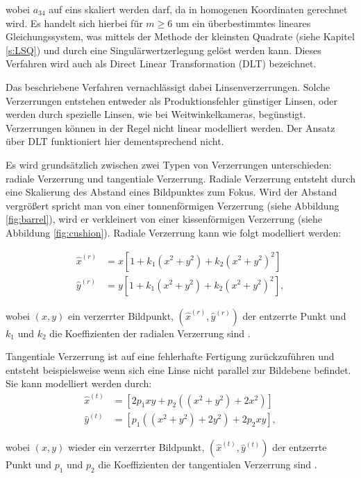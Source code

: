 wobei $a_{34}$ auf eins skaliert werden darf, da in homogenen Koordinaten gerechnet wird. Es handelt sich hierbei für $m \geq 6$ um ein überbestimmtes lineares Gleichungssystem, was mittels der Methode der kleinsten Quadrate (siehe Kapitel \ref{s:LSQ}) und durch eine Singulärwertzerlegung gelöst werden kann.
Dieses Verfahren wird auch als Direct Linear Transformation (DLT) bezeichnet.

Das beschriebene Verfahren vernachlässigt dabei Linsenverzerrungen. Solche Verzerrungen entstehen entweder als Produktionsfehler günstiger Linsen, oder werden durch spezielle Linsen, wie bei Weitwinkelkameras, begünstigt. Verzerrungen können in der Regel nicht linear modelliert werden. Der Ansatz über DLT funktioniert hier dementsprechend nicht.

Es wird grundsätzlich zwischen zwei Typen von Verzerrungen unterschieden: radiale Verzerrung und tangentiale Verzerrung.
Radiale Verzerrung entsteht durch eine Skalierung des Abstand eines Bildpunktes zum Fokus. Wird der Abstand vergrößert spricht man von einer tonnenförmigen Verzerrung (siehe Abbildung \ref{fig:barrel}), wird er verkleinert von einer kissenförmigen Verzerrung (siehe Abbildung \ref{fig:cushion}).
Radiale Verzerrung kann wie folgt modelliert werden:

\[
\begin{aligned}
\hat{x}^{(r)} &= x\left[1 + k_1\left(x^2 + y^2\right) + k_2\left(x^2 + y^2\right)^2 \right] \\
\hat{y}^{(r)} &= y\left[1 + k_1\left(x^2 + y^2\right) + k_2\left(x^2 + y^2\right)^2 \right],
\end{aligned}
\]

wobei $(x,y)$ ein verzerrter Bildpunkt, $(\hat{x}^{(r)}, \hat{y}^{(r)})$ der entzerrte Punkt und $k_1$ und $k_2$ die Koeffizienten der radialen Verzerrung sind \cite{Zhang2002}.

Tangentiale Verzerrung ist auf eine fehlerhafte Fertigung zurückzuführen und entsteht beispielsweise wenn sich eine Linse nicht parallel zur Bildebene befindet.
Sie kann modelliert werden durch:
\[
\begin{aligned}
\hat{x}^{(t)} &= \left[2p_1xy + p_2\left((x^2 + y^2) + 2x^2\right)\right] \\
\hat{y}^{(t)} &= \left[p_1\left((x^2 + y^2) + 2y^2\right) + 2p_2xy\right],
\end{aligned}
\]

wobei $(x,y)$ wieder ein verzerrter Bildpunkt, $(\hat{x}^{(t)}, \hat{y}^{(t)})$ der entzerrte Punkt und $p_1$ und $p_2$ die Koeffizienten der tangentialen Verzerrung sind \cite{Heikkila1997}.

